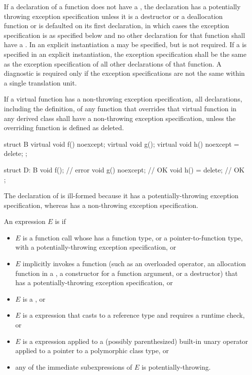 \pnum
If a declaration of a function
does not have a ,
the declaration has a potentially throwing exception specification
unless it is a destructor or a deallocation function
or is defaulted on its first declaration,
in which cases the exception specification
is as specified below
and no other declaration for that function
shall have a .
In an explicit instantiation
a  may be specified,
but is not required.
If a  is specified
in an explicit instantiation,
the exception specification shall be the same as
the exception specification of all other declarations of that function.
A diagnostic is required only if the
exception specifications are not the same
within a single translation unit.

\pnum
{}%
If a virtual function has a
non-throwing exception specification,
all declarations, including the definition, of any function
that overrides that virtual function in any derived class
shall have a non-throwing
exception specification,
unless the overriding function is defined as deleted.
\begin{example}
\begin{codeblock}
struct B {
  virtual void f() noexcept;
  virtual void g();
  virtual void h() noexcept = delete;
};

struct D: B {
  void f();                     // error
  void g() noexcept;            // OK
  void h() = delete;            // OK
};
\end{codeblock}

The declaration of
is ill-formed because it
has a potentially-throwing exception specification,
whereas
has a non-throwing exception specification.
\end{example}

\pnum
An expression $E$ is
 if
\begin{itemize}
\item
$E$ is a function call
whose 
has a function type,
or a pointer-to-function type,
with a potentially-throwing exception specification,
or
\item
$E$ implicitly invokes a function
(such as an overloaded operator,
an allocation function in a ,
a constructor for a function argument,
or a destructor)
that has a potentially-throwing exception specification,
or
\item
$E$ is a ,
or
\item
$E$ is a  expression that casts to a reference type and
requires a runtime check,
or
\item
$E$ is a  expression applied to a
(possibly parenthesized) built-in unary \tcode{*} operator
applied to a pointer to a
polymorphic class type,
or
\item
any of the immediate subexpressions
of $E$ is potentially-throwing.
\end{itemize}

